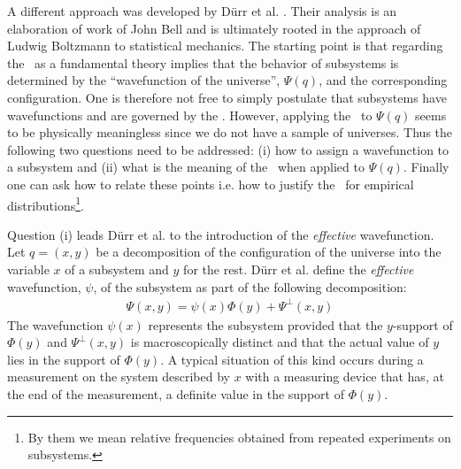 A different approach was developed by D\"urr et al. \cite{dgz}. Their analysis is an elaboration of work of John Bell
and is ultimately rooted in the approach of Ludwig Boltzmann to statistical mechanics.
The starting point is that regarding the \dbb\ as a fundamental theory implies that the behavior of subsystems is determined by the 
``wavefunction of the universe'', $\Psi(q)$, and the corresponding 
configuration.
One is therefore not free to simply postulate that subsystems have wavefunctions and are governed by the \dbb. 
However, applying the \qeh\  to $\Psi(q)$ seems to be physically meaningless since we do not have a sample of universes. 
Thus the following two questions need to be addressed: (i) how to assign a wavefunction to a subsystem and (ii) what is the meaning 
of the \qeh\ when applied to $\Psi(q)$. Finally one can ask how to relate these points i.e. how to
justify the \qeh\ for empirical distributions\footnote{By them we mean relative frequencies obtained from repeated experiments 
on subsystems.}.  

Question (i) leads D\"urr et al. to the introduction of the {\em effective} wavefunction.   
Let $q=(x,y)$ be a decomposition of the configuration of the universe into the variable $x$ of a subsystem and $y$ 
for the rest. D\"urr et al. define the {\em effective} wavefunction, $\psi$, of the subsystem as part of the following decomposition:
\begin{eqnarray}
\Psi(x,y)=\psi(x)\Phi(y)+\Psi^{\perp}(x,y)
\end{eqnarray}
The wavefunction $\psi(x)$ represents the subsystem provided that
the $y$-support of $\Phi(y)$ and $\Psi^{\perp}(x,y)$ is macroscopically distinct and that the actual value of $y$ lies in the 
support of $\Phi(y)$. A typical situation of this kind occurs during a measurement on the system described by $x$ with a 
measuring device that has, at the end of the measurement, a definite value in the support of $\Phi(y)$.

